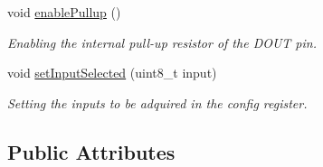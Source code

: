 \begin{DoxyCompactItemize}
void \mbox{\hyperlink{class_a_d_s1118_a833326b882b86608d62450fcedabbe4a}{enable\+Pullup}} ()
\begin{DoxyCompactList}\small\item\em Enabling the internal pull-\/up resistor of the D\+O\+UT pin. \end{DoxyCompactList}\item 
void \mbox{\hyperlink{class_a_d_s1118_a074c71a9eeb1d0db946f5f4b1308c69f}{set\+Input\+Selected}} (uint8\+\_\+t input)
\begin{DoxyCompactList}\small\item\em Setting the inputs to be adquired in the config register. \end{DoxyCompactList}\end{DoxyCompactItemize}
\subsection*{Public Attributes}
